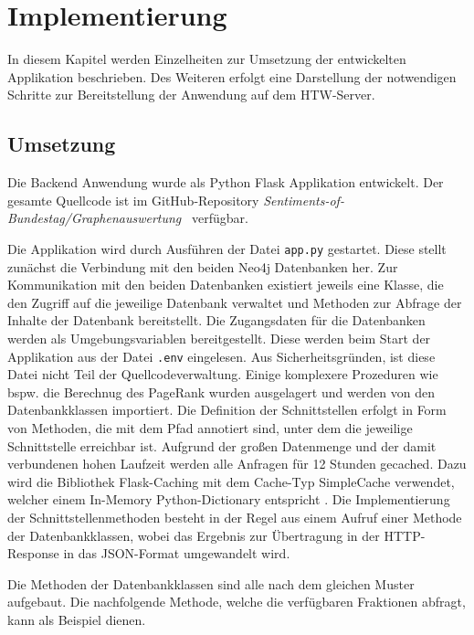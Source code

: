 \section{Implementierung}\label{sec:07_04_implementierung}
In diesem Kapitel werden Einzelheiten zur Umsetzung der entwickelten Applikation beschrieben.
Des Weiteren erfolgt eine Darstellung der notwendigen Schritte zur Bereitstellung der Anwendung auf dem HTW-Server.

\subsection{Umsetzung}
Die Backend Anwendung wurde als Python Flask Applikation entwickelt. Der gesamte Quellcode ist im GitHub-Repository \textit{Sentiments-of-Bundestag/Graphenauswertung}~\cite{github_graphenauswertung} verfügbar.

Die Applikation wird durch Ausführen der Datei \lstinline|app.py| gestartet.
Diese stellt zunächst die Verbindung mit den beiden Neo4j Datenbanken her.
Zur Kommunikation mit den beiden Datenbanken existiert jeweils eine Klasse, die den Zugriff auf die jeweilige Datenbank verwaltet und Methoden zur Abfrage der Inhalte der Datenbank bereitstellt.
Die Zugangsdaten für die Datenbanken werden als Umgebungsvariablen bereitgestellt. Diese werden beim Start der Applikation aus der Datei \lstinline|.env| eingelesen.
Aus Sicherheitsgründen, ist diese Datei nicht Teil der Quellcodeverwaltung.
Einige komplexere Prozeduren wie bspw. die Berechnug des PageRank wurden ausgelagert und werden von den Datenbankklassen importiert.
Die Definition der Schnittstellen erfolgt in Form von Methoden, die mit dem Pfad annotiert sind, unter dem die jeweilige Schnittstelle erreichbar ist.
Aufgrund der großen Datenmenge und der damit verbundenen hohen Laufzeit werden alle Anfragen für 12 Stunden gecached.
Dazu wird die Bibliothek Flask-Caching mit dem Cache-Typ SimpleCache verwendet, welcher einem In-Memory Python-Dictionary entspricht \cite{flask_caching}.
Die Implementierung der Schnittstellenmethoden besteht in der Regel aus einem Aufruf einer Methode der Datenbankklassen, wobei das Ergebnis zur Übertragung in der HTTP-Response in das JSON-Format umgewandelt wird.

Die Methoden der Datenbankklassen sind alle nach dem gleichen Muster aufgebaut.
Die nachfolgende Methode, welche die verfügbaren Fraktionen abfragt, kann als Beispiel dienen.

